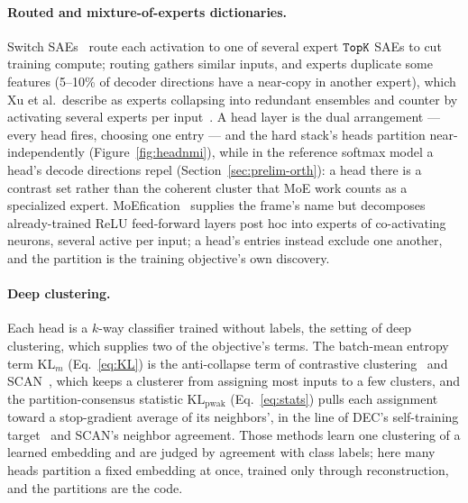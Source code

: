 \documentclass[11pt]{article}
\begin{document}
\paragraph{Routed and mixture-of-experts dictionaries.}
Switch SAEs~\cite{mudide2025} route each activation to one of several
expert $\mathop{\mathtt{TopK}}\limits$ SAEs to cut training compute;
routing gathers similar inputs, and experts duplicate some features
(5--10\% of decoder directions have a near-copy in another expert), which
Xu et al.\ describe as experts collapsing into redundant ensembles and
counter by activating several experts per
input~\cite{xu2025redundancydiversespecializedmultiexpert}. A head layer is
the dual arrangement --- every head fires, choosing one entry --- and the
hard stack's heads partition near-independently
(Figure~\ref{fig:headnmi}), while in the reference softmax model a head's
decode directions repel (Section~\ref{sec:prelim-orth}): a head there is a
contrast set rather than the coherent cluster that MoE work counts as a
specialized expert. MoEfication~\cite{zhang2022} supplies the frame's name
but decomposes already-trained ReLU feed-forward layers post hoc into
experts of co-activating neurons, several active per input; a head's
entries instead exclude one another, and the partition is the training
objective's own discovery.

\paragraph{Deep clustering.}
Each head is a $k$-way classifier trained without labels, the setting of
deep clustering, which supplies two of the objective's terms. The
batch-mean entropy term $\mathrm{KL}_m$ (Eq.~\eqref{eq:KL}) is the
anti-collapse term of contrastive clustering~\cite{li2021cc} and
SCAN~\cite{vangansbeke2020scan}, which keeps a clusterer from assigning
most inputs to a few clusters, and the partition-consensus statistic
$\mathrm{KL}_{\mathrm{pwak}}$ (Eq.~\eqref{eq:stats}) pulls each
assignment toward a stop-gradient average of its neighbors', in the line
of DEC's self-training target~\cite{xie2016dec} and SCAN's neighbor
agreement. Those methods learn one clustering of a learned embedding and
are judged by agreement with class labels; here many heads partition a
fixed embedding at once, trained only through reconstruction, and the
partitions are the code.
\end{document}
